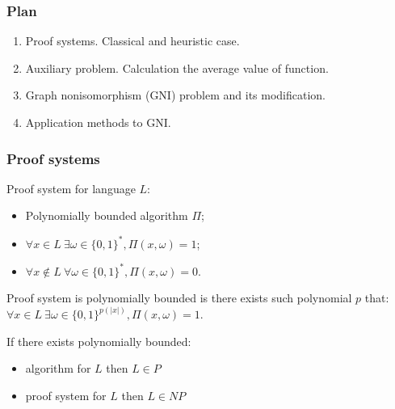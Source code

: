 \begin{frame}
    \frametitle{Plan}

    \begin{enumerate}
	    \item Proof systems. Classical and heuristic case.
    	\item Auxiliary problem. Calculation the average value of function.
    	\item Graph nonisomorphism (GNI) problem and its modification.
    	\item Application methods to GNI.
    \end{enumerate}
\end{frame}

\begin{frame}
	\frametitle{Proof systems}

    \begin{definition}
        Proof system for language $L$:
        \begin{itemize}
            \item Polynomially bounded algorithm $\Pi$;
            \item $\forall x \in L~ \exists \omega \in \{0, 1\}^{*}, \Pi(x, \omega) = 1$;
        	\item $\forall x \notin L~ \forall \omega \in \{0, 1\}^{*}, 
        		\Pi(x, \omega) = 0$.
        \end{itemize}
    \end{definition}

    Proof system is polynomially bounded is there exists such polynomial $p$ that:
    $\forall x \in L~ \exists \omega \in \{0, 1\}^{p(|x|)}, \Pi(x, \omega) = 1$.


    If there exists polynomially bounded:
    \begin{itemize}
        \item algorithm for $L$ then $L \in P$
	    \item proof system for $L$ then $L \in NP$
    \end{itemize}

\end{frame}

